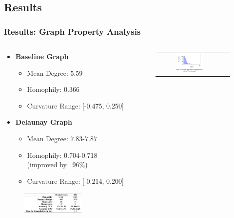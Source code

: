 \documentclass[10pt, aspectratio = 169]{beamer}
\begin{document}
\subsection{Results}
\begin{frame}
    \frametitle{Results: Graph Property Analysis}

    \begin{columns}[t]
        \begin{column}{0.5\textwidth}
            \begin{itemize}
                \item \textbf{Baseline Graph}
                \begin{itemize}
                    \item Mean Degree: 5.59
                    \item Homophily: 0.366
                    \item Curvature Range: [-0.475, 0.250]
                \end{itemize}
                \item \textbf{Delaunay Graph}
                \begin{itemize}
                    \item Mean Degree: 7.83-7.87
                    \item Homophily: 0.704-0.718 (improved by ~96\%)
                    \item Curvature Range: [-0.214, 0.200]
                \end{itemize}
            \end{itemize}
            \begin{figure}
                \includegraphics[width=0.7\textwidth]{figures/wisconsin_results.png}
            \end{figure}
        \end{column}
        \begin{column}{0.5\textwidth}
            \begin{figure}
                \begin{tabular}{cc}
                    \includegraphics[width=0.45\textwidth]{figures/Wisconsin_degree_distrib_original.png} &

\end{tabular}
\end{figure}
\end{column}
\end{columns}
\end{frame}
\end{document}
